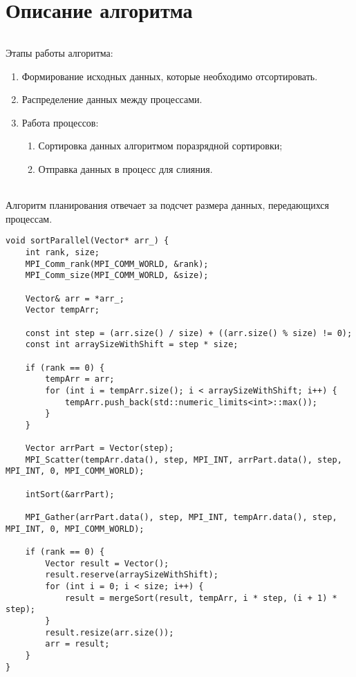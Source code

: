 \documentclass[12pt,a4paper]{article}
\begin{document}
\part*{Описание алгоритма}
\paragraph{}Этапы работы алгоритма:
\begin{enumerate} 
\item Формирование исходных данных, которые необходимо отсортировать.
\item Распределение данных между  процессами.
\item Работа процессов:
\begin{enumerate}
    \item Сортировка данных алгоритмом поразрядной сортировки;
    \item Отправка данных в процесс для слияния.
\end{enumerate}
\end{enumerate} 
\paragraph{}Алгоритм планирования отвечает за подсчет размера данных, передающихся процессам. 
\begin{lstlisting}
void sortParallel(Vector* arr_) {
	int rank, size;
	MPI_Comm_rank(MPI_COMM_WORLD, &rank);
	MPI_Comm_size(MPI_COMM_WORLD, &size);
	
	Vector& arr = *arr_;
	Vector tempArr;
	
	const int step = (arr.size() / size) + ((arr.size() % size) != 0);
	const int arraySizeWithShift = step * size;
	
	if (rank == 0) {
		tempArr = arr;
		for (int i = tempArr.size(); i < arraySizeWithShift; i++) {
			tempArr.push_back(std::numeric_limits<int>::max());
		}
	}
	
	Vector arrPart = Vector(step);
	MPI_Scatter(tempArr.data(), step, MPI_INT, arrPart.data(), step, MPI_INT, 0, MPI_COMM_WORLD);
	
	intSort(&arrPart);
	
	MPI_Gather(arrPart.data(), step, MPI_INT, tempArr.data(), step, MPI_INT, 0, MPI_COMM_WORLD);
	
	if (rank == 0) {
		Vector result = Vector();
		result.reserve(arraySizeWithShift);
		for (int i = 0; i < size; i++) {
			result = mergeSort(result, tempArr, i * step, (i + 1) * step);
		}
		result.resize(arr.size());
		arr = result;
	}
}
\end{lstlisting}
\end{document}
